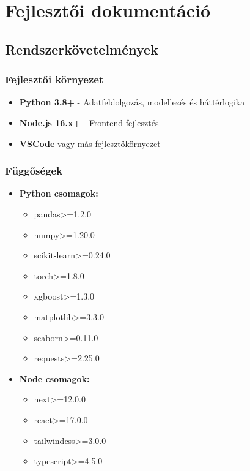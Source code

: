 \chapter{Fejlesztői dokumentáció}



\section{Rendszerkövetelmények}

\subsection{Fejlesztői környezet}

\begin{itemize}
    \item \textbf{Python 3.8+} - Adatfeldolgozás, modellezés és háttérlogika
    \item \textbf{Node.js 16.x+} - Frontend fejlesztés
    \item \textbf{VSCode} vagy más fejlesztőkörnyezet
\end{itemize}

\subsection{Függőségek}

\begin{itemize}
    \item \textbf{Python csomagok:}
    \begin{itemize}
        \item pandas>=1.2.0
        \item numpy>=1.20.0
        \item scikit-learn>=0.24.0
        \item torch>=1.8.0
        \item xgboost>=1.3.0
        \item matplotlib>=3.3.0
        \item seaborn>=0.11.0
        \item requests>=2.25.0
    \end{itemize}
    
    \item \textbf{Node csomagok:}
    \begin{itemize}
        \item next>=12.0.0
        \item react>=17.0.0
        \item tailwindcss>=3.0.0
        \item typescript>=4.5.0
    \end{itemize}
\end{itemize}


